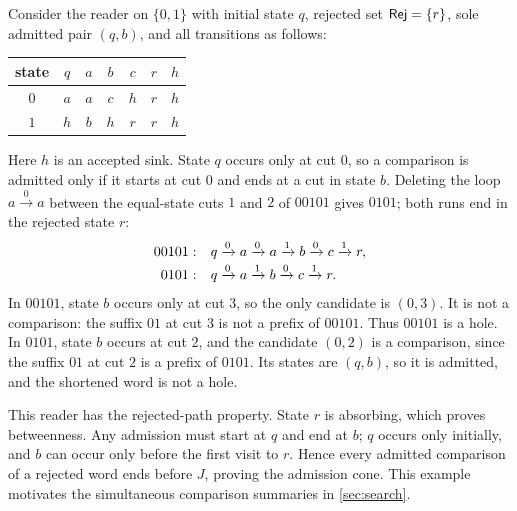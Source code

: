 \begin{example}\label{ex:loop-deletion}
Consider the reader on $\{0,1\}$ with initial state $q$, rejected set
$\mathsf{Rej}=\{r\}$, sole admitted pair $(q,b)$, and all transitions as follows:
\begin{center}
\begin{tabular}{@{}c|cccccc@{}}
state & $q$ & $a$ & $b$ & $c$ & $r$ & $h$\\
\hline
$0$ & $a$ & $a$ & $c$ & $h$ & $r$ & $h$\\
$1$ & $h$ & $b$ & $h$ & $r$ & $r$ & $h$
\end{tabular}
\end{center}
Here $h$ is an accepted sink. State $q$ occurs only at cut $0$, so a
comparison is admitted only if it starts at cut $0$ and ends at a cut in
state $b$. Deleting the loop $a\xrightarrow{0}a$ between the equal-state
cuts $1$ and $2$ of $00101$ gives $0101$; both runs end in the rejected
state $r$:
\[
\begin{array}{r@{\quad}l}
 00101: & q\xrightarrow{0}a\xrightarrow{0}a\xrightarrow{1}b
          \xrightarrow{0}c\xrightarrow{1}r,\\[2pt]
 0101: & q\xrightarrow{0}a\xrightarrow{1}b\xrightarrow{0}c\xrightarrow{1}r.
\end{array}
\]
In $00101$, state $b$ occurs only at cut $3$, so the only candidate is
$(0,3)$. It is not a comparison: the suffix $01$ at cut $3$ is not a
prefix of $00101$. Thus $00101$ is a hole. In $0101$, state $b$ occurs at
cut $2$, and the candidate $(0,2)$ is a comparison, since the suffix $01$
at cut $2$ is a prefix of $0101$. Its states are $(q,b)$, so it is
admitted, and the shortened word is not a hole.

This reader has the rejected-path property. State $r$ is absorbing,
which proves betweenness. Any admission must start at $q$ and end at
$b$; $q$ occurs only initially, and $b$ can occur only before the first
visit to $r$. Hence every admitted comparison of a rejected word ends
before $J$, proving the admission cone. This example motivates the
simultaneous comparison summaries in \cref{sec:search}.
\end{example}
